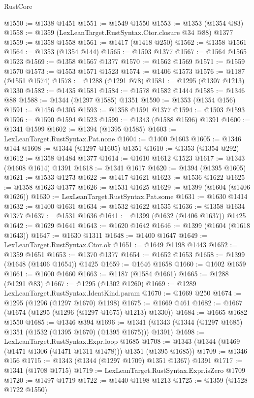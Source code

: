 \begin{lexlean}{RustCore}
\begin{coremodule}
@1550 := @1338 @1451
@1551 := @1549 @1550
@1553 := @1353 (@1354 @83)
@1558 := @1359 (LexLeanTarget.RustSyntax.Ctor.closure @34 @88) @1377
@1559 := @1358 @1558
@1561 := @1417 (@1418 @250)
@1562 := @1358 @1561
@1564 := @1353 (@1354 @144)
@1565 := @1503 @1377
@1567 := @1564 @1565 @1523
@1569 := @1358 @1567 @1377
@1570 := @1562 @1569
@1571 := @1559 @1570
@1573 := @1553 @1571 @1523
@1574 := @1406 @1573
@1576 := @1187 (@1551 @1574)
@1578 := @1288 (@1291 @78)
@1581 := @1295 (@1307 @1213) @1330
@1582 := @1435 @1581
@1584 := @1578 @1582 @1444
@1585 := @1346 @88
@1588 := @1344 (@1297 @1585) @1351
@1590 := @1353 (@1354 @156)
@1591 := @1456 @1305
@1593 := @1358 @1591 @1377
@1594 := @1503 @1593
@1596 := @1590 @1594 @1523
@1599 := @1343 (@1588 @1596) @1391
@1600 := @1341 @1599
@1602 := @1394 (@1395 @1585)
@1603 := LexLeanTarget.RustSyntax.Pat.none
@1604 := @1400 @1603
@1605 := @1346 @144
@1608 := @1344 (@1297 @1605) @1351
@1610 := @1353 (@1354 @292)
@1612 := @1358 @1484 @1377
@1614 := @1610 @1612 @1523
@1617 := @1343 (@1608 @1614) @1391
@1618 := @1341 @1617
@1620 := @1394 (@1395 @1605)
@1621 := @1533 @1273
@1622 := @1417 @1621
@1623 := @1536 @1622
@1625 := @1358 @1623 @1377
@1626 := @1531 @1625
@1629 := @1399 (@1604 (@1406 @1626))
@1630 := LexLeanTarget.RustSyntax.Pat.some
@1631 := @1630 @1414
@1632 := @1400 @1631
@1634 := @1532 @1622 @1535
@1636 := @1358 @1634 @1377
@1637 := @1531 @1636
@1641 := @1399 (@1632 (@1406 @1637)) @1425
@1642 := @1629 @1641
@1643 := @1620 @1642
@1646 := @1399 (@1604 (@1618 @1643))
@1647 := @1630 @1311
@1648 := @1400 @1647
@1649 := LexLeanTarget.RustSyntax.Ctor.ok
@1651 := @1649 @1198 @1443
@1652 := @1359 @1651
@1653 := @1370 @1377
@1654 := @1652 @1653
@1658 := @1399 (@1648 (@1406 @1654)) @1425
@1659 := @1646 @1658
@1660 := @1602 @1659
@1661 := @1600 @1660
@1663 := @1187 (@1584 @1661)
@1665 := @1288 (@1291 @83)
@1667 := @1295 (@1302 @1260)
@1669 := @1289 LexLeanTarget.RustSyntax.IdentKind.param
@1670 := @1669 @250
@1674 := @1295 (@1296 (@1297 @1670) @1198)
@1675 := @1669 @461
@1682 := @1667 (@1674 (@1295 (@1296 (@1297 @1675) @1213) @1330))
@1684 := @1665 @1682 @1550
@1685 := @1346 @394
@1696 := @1341 (@1343 (@1344 (@1297 @1685) @1351 (@1532 (@1395 @1670) (@1395 @1675))) @1391)
@1698 := LexLeanTarget.RustSyntax.Expr.loop @1685
@1708 := @1343 (@1344 (@1469 (@1471 @1306 (@1471 @1311 @1478))) @1351 (@1395 @1685))
@1709 := @1346 @156
@1715 := @1343 (@1344 (@1297 @1709) @1351 @1367) @1391
@1717 := @1341 (@1708 @1715)
@1719 := LexLeanTarget.RustSyntax.Expr.isZero @1709
@1720 := @1497 @1719
@1722 := @1440 @1198 @1213
@1725 := @1359 (@1528 @1722 @1550)

\end{coremodule}
\end{lexlean}
